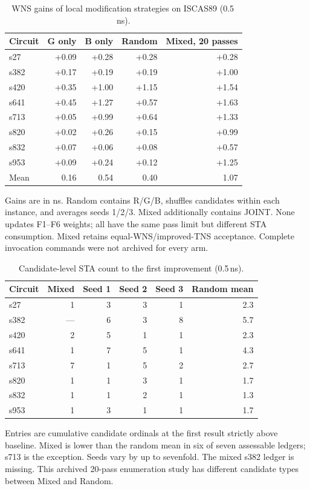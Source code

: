 \documentclass[preprint,12pt]{elsarticle}
\begin{document}
\begin{table}[htbp]\centering\small
\caption{WNS gains of local modification strategies on ISCAS89 (0.5\,ns).}\label{tab:ablation}
\begin{tabular}{lrrrr}\toprule
Circuit & G only & B only & Random & Mixed, 20 passes\\\midrule
s27 & +0.09 & +0.28 & +0.28 & +0.28\\
s382 & +0.17 & +0.19 & +0.19 & +1.00\\
s420 & +0.35 & +1.00 & +1.15 & +1.54\\
s641 & +0.45 & +1.27 & +0.57 & +1.63\\
s713 & +0.05 & +0.99 & +0.64 & +1.33\\
s820 & +0.02 & +0.26 & +0.15 & +0.99\\
s832 & +0.07 & +0.06 & +0.08 & +0.57\\
s953 & +0.09 & +0.24 & +0.12 & +1.25\\\midrule
Mean & 0.16 & 0.54 & 0.40 & 1.07\\\bottomrule
\end{tabular}
\par\smallskip\footnotesize Gains are in ns. Random contains R/G/B, shuffles candidates within each instance, and averages seeds 1/2/3. Mixed additionally contains JOINT. None updates F1--F6 weights; all have the same pass limit but different STA consumption. Mixed retains equal-WNS/improved-TNS acceptance. Complete invocation commands were not archived for every arm.
\end{table}

\begin{table}[htbp]\centering\small
\caption{Candidate-level STA count to the first improvement (0.5\,ns).}\label{tab:efficiency}
\begin{tabular}{lrrrrr}\toprule
Circuit & Mixed & Seed 1 & Seed 2 & Seed 3 & Random mean\\\midrule
s27 & 1 & 3 & 3 & 1 & 2.3\\
s382 & --- & 6 & 3 & 8 & 5.7\\
s420 & 2 & 5 & 1 & 1 & 2.3\\
s641 & 1 & 7 & 5 & 1 & 4.3\\
s713 & 7 & 1 & 5 & 2 & 2.7\\
s820 & 1 & 1 & 3 & 1 & 1.7\\
s832 & 1 & 1 & 2 & 1 & 1.3\\
s953 & 1 & 3 & 1 & 1 & 1.7\\\bottomrule
\end{tabular}
\par\smallskip\footnotesize Entries are cumulative candidate ordinals at the first result strictly above baseline. Mixed is lower than the random mean in six of seven assessable ledgers; s713 is the exception. Seeds vary by up to sevenfold. The mixed s382 ledger is missing. This archived 20-pass enumeration study has different candidate types between Mixed and Random.
\end{table}
\end{document}
